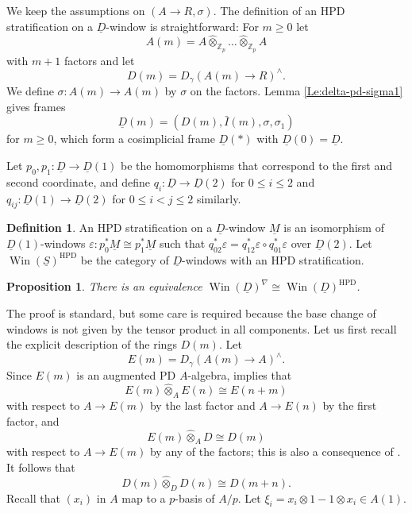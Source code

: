\documentclass[a4paper,11pt]{article}
\theoremstyle{plain}
\newtheorem{Prop}[Lemma]{Proposition}
\theoremstyle{definition}
\newtheorem{Defn}[Lemma]{Definition}
\theoremstyle{remark}
\theoremstyle{definition}
\numberwithin{Lemma}{section}
\numberwithin{Subpoint}{Lemma}
\numberwithin{equation}{section}
\newcommand{\ZZ}{{\mathbb{Z}}}
\DeclareMathOperator{\HPD}{HPD}
\DeclareMathOperator{\Win}{Win}
\newcommand{\hatotimes}{\mathbin{\hat\otimes}}
\renewcommand{\u}{\underline}
\newcommand{\chang}[1]{{#1}}
\begin{document}
We keep the assumptions on $(A\to R,\sigma)$.
The definition of an HPD stratification
on a $\u D$-window is straightforward:
For $m\ge 0$ let 
\[
A(m)=A\hatotimes_{\ZZ_p}\ldots\hatotimes_{\ZZ_p} A
\]
with $m+1$ factors and let 
\[
D(m)=D_\gamma(A(m)\to R)^\wedge.
\]
We define $\sigma:A(m)\to A(m)$ by $\sigma$ on the factors. 
Lemma \chang{\ref{Le:delta-pd-sigma1}} gives frames 
\[
\u D(m)=(D(m),\bar I(m),\sigma,\sigma_1)
\] 
for $m\ge 0$, 
which form a cosimplicial frame $\u D(*)$ with $\u D(0)=\u D$.

Let $p_0,p_1:\u D\to\u D(1)$ be the homomorphisms that
correspond to the first and second coordinate,
and define $q_i:\u D\to\u D(2)$ for $0\le i\le 2$
and $q_{ij}:\u D(1)\to\u D(2)$ for $0\le i<j\le 2$ similarly.

\begin{Defn}
An HPD stratification on a $\u D$-window $\u M$ 
is an isomorphism of $\u D(1)$-windows
$\varepsilon:p_0^*\u M\cong p_1^*\u M$ such that
$q_{02}^*\varepsilon=q_{12}^*\varepsilon\circ q_{01}^*\varepsilon$
over $\u D(2)$.
Let $\Win(\u S)^{\HPD}$ be the category of $\u D$-windows with an
HPD stratification.
\end{Defn}

\begin{Prop}
\label{Pr:nabla-HPD}
There is an equivalence $\Win(\u D)^\nabla\cong\Win(\u D)^{\HPD}$.
\end{Prop}

The proof is standard, 
but some care is required because the base change of windows is
not \chang{given by} the tensor product in all components.
Let us first recall the explicit description of the rings $D(m)$.
Let 
\[
E(m)=D_\gamma(A(m)\to A)^\wedge.
\]
Since $E(m)$ is an augmented PD $A$-algebra,
\cite[I Cor.~1.7.2]{Berthelot:CohCristalline}
implies that 
\begin{equation}
\label{Eq:EAE}
E(m)\hatotimes_AE(n)\cong E(n+m)
\end{equation}
with respect to $A\to E(m)$ by the last factor and $A\to E(n)$
by the first factor, and
\begin{equation}
\label{Eq:EAD}
E(m)\hat\otimes_AD\cong D(m)
\end{equation}
with respect to $A\to E(m)$ by any of the factors;
this is also a consequence of 
\cite[IV Cor.~1.3.5]{Berthelot:CohCristalline}.
It follows that
\begin{equation}
\label{Eq:DDD}
D(m)\hatotimes_DD(n)\cong D(m+n).
\end{equation}
Recall that $(x_i)$ in $A$ map to a $p$-basis of $A/p$.
Let $\xi_i=x_i\otimes 1-1\otimes x_i\in A(1)$.
\end{document}

